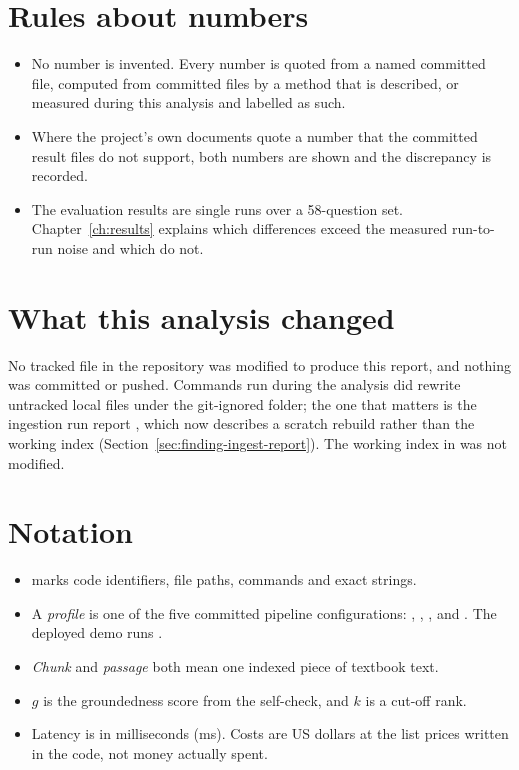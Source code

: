 \section*{Rules about numbers}

\begin{itemize}
  \item No number is invented. Every number is quoted from a named committed file, computed from committed files by a method that is described, or measured during this analysis and labelled as such.
  \item Where the project's own documents quote a number that the committed result files do not support, both numbers are shown and the discrepancy is recorded.
  \item The evaluation results are single runs over a 58-question set. Chapter~\ref{ch:results} explains which differences exceed the measured run-to-run noise and which do not.
\end{itemize}

\section*{What this analysis changed}

No tracked file in the repository was modified to produce this report, and nothing was committed or pushed. Commands run during the analysis did rewrite untracked local files under the git-ignored  folder; the one that matters is the ingestion run report , which now describes a scratch rebuild rather than the working index (Section~\ref{sec:finding-ingest-report}). The working index in  was not modified.

\section*{Notation}

\begin{itemize}
  \item {} marks code identifiers, file paths, commands and exact strings.
  \item A \emph{profile} is one of the five committed pipeline configurations: , , ,  and . The deployed demo runs .
  \item \emph{Chunk} and \emph{passage} both mean one indexed piece of textbook text.
  \item $g$ is the groundedness score from the self-check, and $k$ is a cut-off rank.
  \item Latency is in milliseconds (ms). Costs are US dollars at the list prices written in the code, not money actually spent.
\end{itemize}

